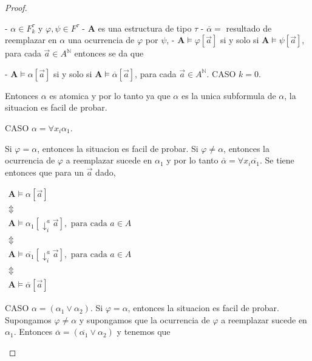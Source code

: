 \begin{proof}
\begin{itemize}
      - $\alpha \in F_{k}^{\tau }$ y $\varphi ,\psi \in F^{\tau }$
      - $\mathbf{A}$ es una estructura de tipo $\tau $
      - $\overline{\alpha }=$ resultado de reemplazar en $\alpha $ una ocurrencia de $\varphi$ por $\psi$,
      - $\mathbf{A}\models \varphi \left\lbrack \vec{a}\right\rbrack $ si y solo si $ \mathbf{A}\models \psi \left\lbrack \vec{a}\right\rbrack $, para cada $\vec{a}\in A^{ \mathbb{N}}$
      entonces se da que

      - $\mathbf{A}\models \alpha \left\lbrack \vec{a}\right\rbrack $ si y solo si $ \mathbf{A}\models \overline{\alpha }\left\lbrack \vec{a}\right\rbrack $, para cada $\vec{ a}\in A^{\mathbb{N}}$.
      CASO $k=0.$

      Entonces $\alpha $ es atomica y por lo tanto ya que $\alpha $ es la unica subformula de $\alpha $, la situacion es facil de probar.

      CASO $\alpha =\forall x_{i}\alpha _{1}.$

      Si $\varphi =\alpha $, entonces la situacion es facil de probar. Si $\varphi \neq \alpha $, entonces la ocurrencia de $\varphi$ a reemplazar sucede en $\alpha _{1}$ y por lo tanto $\overline{\alpha }=\forall x_{i} \overline{\alpha _{1}}.$ Se tiene entonces que para un $\vec{a}$ dado,

      $\displaystyle \begin{array}{c} \mathbf{A}\models \alpha \left\lbrack \vec{a}\right\rbrack \\ \Updownarrow \\ \mathbf{A}\models \alpha _{1}\left\lbrack \downarrow _{i}^{a}\vec{a}\right\rbrack ,\text{ para cada }a\in A \\ \Updownarrow \\ \mathbf{A}\models \overline{\alpha _{1}}\left\lbrack \downarrow _{i}^{a}\vec{a} \right\rbrack ,\text{ para cada }a\in A \\ \Updownarrow \\ \mathbf{A}\models \overline{\alpha }\left\lbrack \vec{a}\right\rbrack \end{array} $

      CASO $\alpha =(\alpha _{1}\vee \alpha _{2})$.
      Si $\varphi =\alpha $, entonces la situacion es facil de probar. Supongamos $\varphi \neq \alpha $ y supongamos que la ocurrencia de $\varphi$ a reemplazar sucede en $\alpha _{1}$. Entonces $\overline{\alpha }=( \overline{\alpha _{1}}\vee \alpha _{2})$ y tenemos que


\end{itemize}
\end{proof}
